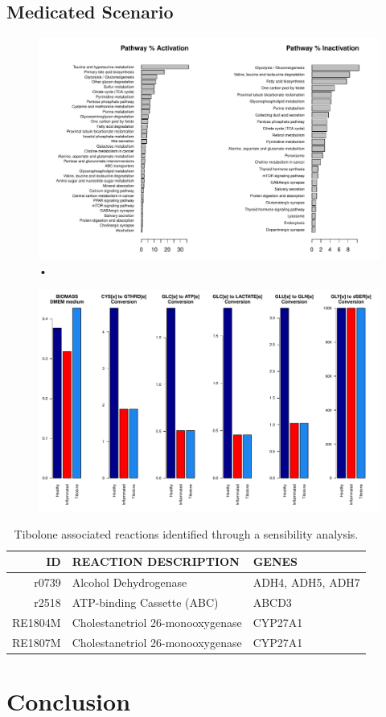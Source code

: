 \subsection*{Medicated Scenario}
\begin{figure}[h]
\begin{center}
\includegraphics[width=\textwidth]{neuroprotective/Inflammated2Tibolone}
\end{center}
\caption{•}
\end{figure}
\begin{figure}[h]
\begin{center}
\includegraphics[width=\textwidth]{neuroprotective/Effects}
\end{center}
\caption{}
\label{Effects}
\end{figure}
\begin{table}
\caption{Tibolone associated reactions identified through a sensibility analysis.}
\begin{center}
\begin{tabular}{rll}
\hline
ID & REACTION DESCRIPTION & GENES\\
\hline
\hline
r0739 & Alcohol Dehydrogenase & ADH4, ADH5, ADH7\\
r2518 & ATP-binding Cassette (ABC) & ABCD3\\
RE1804M &	Cholestanetriol 26-monooxygenase& CYP27A1 \\
RE1807M & Cholestanetriol 26-monooxygenase& CYP27A1 \\
\hline
\end{tabular}
\end{center}
\end{table}
\section{Conclusion}
